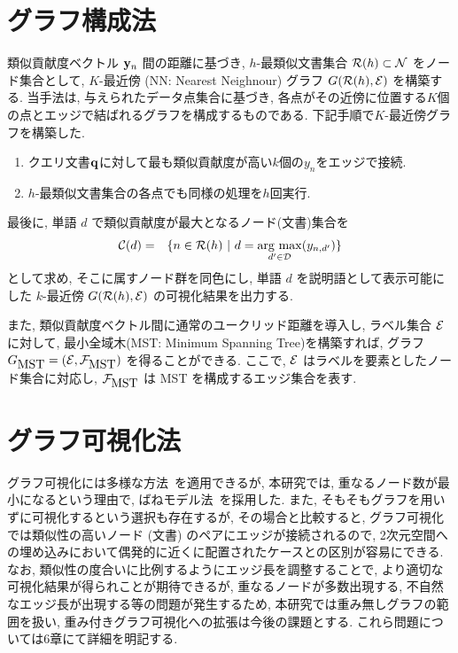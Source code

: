 \documentclass[a4paper,12pt]{jsreport}
\newcommand{\argmax}{\mathop{\rm arg~max}\limits}
\begin{document}
\section{グラフ構成法}

類似貢献度ベクトル ${\bf y}_n$ 間の距離に基づき, $h$-最類似文書集合 ${\cal R}(h) \subset {\cal N}$ をノード集合として, 
$K$-最近傍 (NN: Nearest Neighnour) グラフ $G({\cal R}(h), {\cal E})$ を構築する. 
当手法は, 与えられたデータ点集合に基づき, 各点がその近傍に位置する$K$個の点とエッジで結ばれるグラフを構成するものである.
下記手順で$K$-最近傍グラフを構築した.
\begin{enumerate}
    \item クエリ文書${\bf q}$に対して最も類似貢献度が高い$k$個の$y_n$をエッジで接続.
    \item $h$-最類似文書集合の各点でも同様の処理を$h$回実行.
\end{enumerate}
最後に, 単語 $d$ で類似貢献度が最大となるノード(文書)集合を
\begin{eqnarray}
{\cal C}(d) & = & \{ n \in {\cal R}(h)~|~d = \argmax_{d' \in {\cal D}} (y_{n,d'}) \} 
\label{sc2}
\end{eqnarray}
として求め, そこに属すノード群を同色にし, 単語 $d$ を説明語として表示可能にした 
$k$-最近傍 $G({\cal R}(h), {\cal E})$ の可視化結果を出力する. 

また, 類似貢献度ベクトル間に通常のユークリッド距離を導入し,
ラベル集合 ${\cal E}$ に対して, 最小全域木(MST: Minimum Spanning Tree)を構築すれば, 
グラフ $G_{\mbox{MST}} = ({\cal E}, {\cal F}_{\mbox{MST}})$ を得ることができる. 
ここで, ${\cal E}$ はラベルを要素としたノード集合に対応し,
${\cal F}_{\mbox{MST}}$ は MST を構成するエッジ集合を表す. 

\section{グラフ可視化法}

グラフ可視化には多様な方法~\cite{saito}を適用できるが, 
本研究では, 重なるノード数が最小になるという理由で, ばねモデル法~\cite{kamada89}を採用した.
また, そもそもグラフを用いずに可視化するという選択も存在するが, 
その場合と比較すると, グラフ可視化では類似性の高いノード (文書) のペアにエッジが接続されるので, 
2次元空間への埋め込みにおいて偶発的に近くに配置されたケースとの区別が容易にできる.
なお, 類似性の度合いに比例するようにエッジ長を調整することで, より適切な可視化結果が得られことが期待できるが, 
重なるノードが多数出現する, 不自然なエッジ長が出現する等の問題が発生するため,
本研究では重み無しグラフの範囲を扱い, 重み付きグラフ可視化への拡張は今後の課題とする. 
これら問題については6章にて詳細を明記する. 
\end{document}
